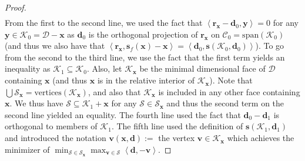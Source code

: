 \documentclass{article} %
\newcommand{\domain}{\mathcal{D}}
\newcommand{\x}{\bm{x}}
\newcommand{\y}{\bm{y}}
\newcommand{\s}{\bm{s}}
\newcommand{\dd}{\bm{d}}
\newcommand{\vv}{\bm{v}} %
\renewcommand{\S}{\mathcal{S}}
\renewcommand{\r}{\bm{r}}
\newcommand{\innerProd}[2]{\left\langle #1 , #2 \right\rangle}
\newcommand{\C}{\mathcal{C}}
\newcommand{\Kface}{\mathcal{K}}
\newcommand{\0}{\mathbf{0}} %
\begin{document}
\begin{proof}
\begin{align}
\end{align}
From the first to the second line, we used the fact that $\innerProd{\r_{\x} - \dd_0}{\y} = 0$ for any $\y \in \Kface_0 = \domain - \x$ as $\dd_0$ is the orthogonal projection of $\r_{\x}$ on $\C_0 = \text{span}(\Kface_0)$ (and thus we also have that $\innerProd{\r_{\x}}{\s_f(\x) - \x} = \innerProd{\dd_0}{\s(\Kface_0, \dd_0)}$). To go from the second to the third line, we use the fact that the first term yields an inequality as $\Kface_1 \subseteq \Kface_0$. Also, let $\Kface_{\x}$ be the minimal dimensional face of $\domain$ containing $\x$ (and thus $\x$ is in the relative interior of $\Kface_{\x}$). Note that $\bigcup \S_{\x} = \text{vertices}(\Kface_{\x})$, and also that $\Kface_{\x}$ is included in any other face containing $\x$. We thus have $\S \subseteq \Kface_1 + \x$ for any $\S \in \S_{\x}$ and thus the second term on the second line yielded an equality. The fourth line used the fact that $\dd_0 - \dd_1$ is orthogonal to members of $\Kface_1$. The fifth line used the definition of $\s(\Kface_1, \dd_1)$ and introduced the notation $ \vv(\x, \dd) :=$ the vertex $\vv \in \Kface_{\x}$ which achieves the minimizer of $\min_{\S \in \S_{\x}} \max_{\vv \in \S } \innerProd{\dd}{ -\vv}$.


\end{proof}
\end{document}
